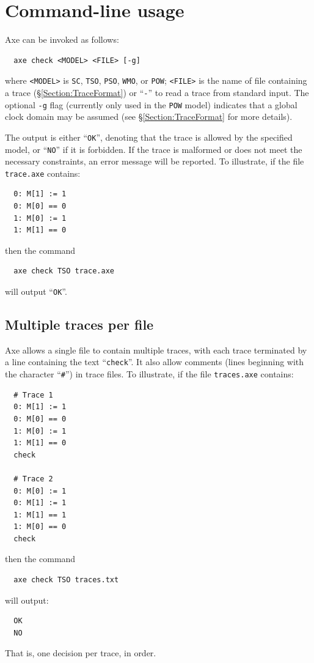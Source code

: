 \documentclass[11pt]{article}
\begin{document}
\section{Command-line usage}
\label{Section:CmdLine}

Axe can be invoked as follows:
\begin{verbatim}
  axe check <MODEL> <FILE> [-g]
\end{verbatim}
\noindent where \verb!<MODEL>! is \verb!SC!, \verb!TSO!, \verb!PSO!,
\verb!WMO!, or \verb!POW!; \verb!<FILE>! is the name of file
containing a trace (\S\ref{Section:TraceFormat}) or ``\verb!-!'' to read a
trace from standard input.  The optional \verb!-g! flag (currently
only used in the \verb!POW! model) indicates that a global clock domain
may be assumed (see \S\ref{Section:TraceFormat} for more details).

The output is either ``\verb!OK!'', denoting that the trace is allowed by
the specified model, or ``\verb!NO!'' if it is forbidden.  If the trace is
malformed or does not meet the necessary constraints, an error message
will be reported.
To illustrate, if the file \verb!trace.axe! contains:
\begin{verbatim}
  0: M[1] := 1
  0: M[0] == 0
  1: M[0] := 1
  1: M[1] == 0
\end{verbatim}
\noindent then the command
\begin{verbatim}
  axe check TSO trace.axe
\end{verbatim}
\noindent will output ``\verb!OK!''.

\subsection*{Multiple traces per file}

Axe allows a single file to contain multiple traces, with each trace
terminated by a line containing the text ``\verb!check!''.  It also allow
comments (lines beginning with the character ``\verb!#!'') in trace
files.
To illustrate, if the file \verb!traces.axe! contains:
\begin{verbatim}
  # Trace 1
  0: M[1] := 1
  0: M[0] == 0
  1: M[0] := 1
  1: M[1] == 0
  check

  # Trace 2
  0: M[0] := 1
  0: M[1] := 1
  1: M[1] == 1
  1: M[0] == 0
  check
\end{verbatim}
\noindent then the command
\begin{verbatim}
  axe check TSO traces.txt
\end{verbatim}
\noindent will output:
\begin{verbatim}
  OK
  NO
\end{verbatim}
\noindent That is, one decision per trace, in order.
\end{document}
